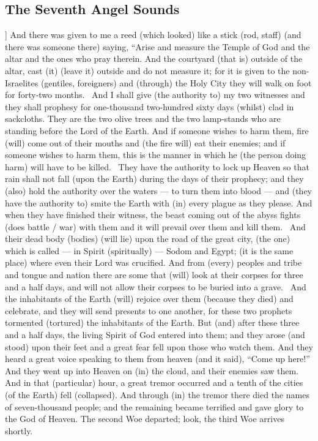 \begin{pages}
\begin{Leftside}
        			\chapter{The Seventh Angel Sounds}
				]		
		And there was given to me a reed (which looked) like a stick (rod, staff) (and there was someone there) saying, “Arise and measure the Temple of God and the altar and the ones who pray therein. And the courtyard (that is) outside of the altar, cast (it) (leave it) outside and do not measure it; for it is given to the non-Israelites (gentiles, foreigners) and (through) the Holy City they will walk on foot for forty-two months. 
		\pend
		\pstart
		And I shall give (the authority to) my two witnesses and they shall prophesy for one-thousand two-hundred sixty days (whilst) clad in sackcloths. They are the two olive trees and the two lamp-stands who are standing before the Lord of the Earth. And if someone wishes to harm them, fire (will) come out of their mouths and (the fire will) eat their enemies; and if someone wishes to harm them, this is the manner in which he (the person doing harm) will have to be killed. 	
		\pend
		\pstart
		They have the authority to lock up Heaven so that rain shall not fall (upon the Earth) during the days of their prophecy; and they (also) hold the authority over the waters — to turn them into blood — and (they have the authority to) smite the Earth with (in) every plague as they please. And when they have finished their witness, the beast coming out of the abyss fights (does battle / war) with them and it will prevail over them and kill them. 
		\pend
		\pstart
		And their dead body (bodies) (will lie) upon the road of the great city, (the one) which is called — in Spirit (spiritually) — Sodom and Egypt; (it is the same place) where even their Lord was crucified. And from (every) peoples and tribe and tongue and nation there are some that (will) look at their corpses for three and a half days, and will not allow their corpses to be buried into a grave. 
		\pend
		\pstart
		And the inhabitants of the Earth (will) rejoice over them (because they died) and celebrate, and they will send presents to one another, for these two prophets tormented (tortured) the inhabitants of the Earth. But (and) after these three and a half days, the living Spirit of God entered into them; and they arose (and stood) upon their feet and a great fear fell upon those who watch them. 
		\pend
		\pstart
		And they heard a great voice speaking to them from heaven (and it said), “Come up here!” And they went up into Heaven on (in) the cloud, and their enemies saw them. And in that (particular) hour, a great tremor occurred and a tenth of the cities (of the Earth) fell (collapsed). And through (in) the tremor there died the names of seven-thousand people; and the remaining became terrified and gave glory to the God of Heaven. The second Woe departed; look, the third Woe arrives shortly. 

\end{Leftside}
\end{pages}
